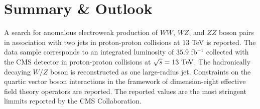\chapter{Summary \& Outlook} %
\label{cha:summary_&_outlook}
A search for anomalous electroweak production of $WW$, $WZ$, and $ZZ$ boson pairs in association with two jets in proton-proton collisions at $13$ TeV is reported. The data sample corresponds to an integrated luminosity of $35.9$ fb$^{-1}$ collected with the CMS detector in proton-proton collisions at $\sqrt{s}=13~\mathrm{TeV}$. The hadronically decaying $W/Z$ boson is reconstructed as one large-radius jet. Constraints on the quartic vector boson interactions in the framework of dimension-eight effective field theory operators are reported. The reported values are the most stringent limmits reported by the CMS Collaboration.

